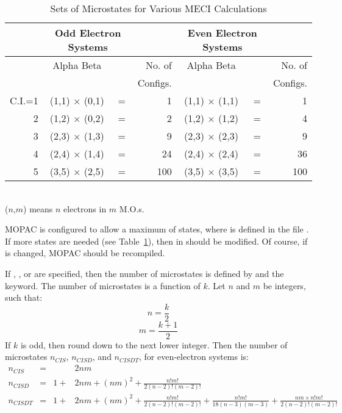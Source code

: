 \label{nmeci}
\begin{table}
\caption{\label{setmic}Sets of Microstates for Various MECI Calculations}
\begin{center}
\begin{tabular}{|rccr|ccr|}
\hline
&\multicolumn{2}{c}{Odd Electron Systems} &  & \multicolumn{2}{c}{Even Electron Systems}&\\ \hline
        &    Alpha   Beta &&No. of   &    Alpha   Beta &&No. of\\
        &                 &&Configs. &                 &&Configs.\\\hline
 C.I.=1&(1,1) $\times$ (0,1) &=&  1    &     (1,1) $\times$ (1,1)&=&   1  \\
      2&(1,2) $\times$ (0,2) &=&  2    &     (1,2) $\times$ (1,2)&=&   4  \\
      3&(2,3) $\times$ (1,3) &=&  9    &     (2,3) $\times$ (2,3)&=&   9  \\
      4&(2,4) $\times$ (1,4) &=& 24    &     (2,4) $\times$ (2,4)&=&  36  \\
      5&(3,5) $\times$ (2,5) &=&100    &     (3,5) $\times$ (3,5)&=& 100  \\\hline
\end{tabular}\\
($n$,$m$) means $n$ electrons in $m$ M.O.s.
\end{center}
\end{table}

 MOPAC is configured to  allow a
maximum of  states, where  is defined in the file
.  If more states are needed (see Table~\ref{setmic}), then
 in   should be modified. Of course, if 
is changed, MOPAC should be recompiled.

If , , or  are specified, then the number of
microstates is defined by  and the keyword.   The number of
microstates is a function of $k$.  Let $n$ and $m$ be integers, such that:
$$
n=\frac{k}{2}
$$
$$
m=\frac{k+1}{2}
$$
If $k$ is odd, then round down to the next lower integer.  Then the number
of microstates $n_{CIS}$, $n_{CISD}$, and $n_{CISDT}$, for even-electron
systems is:
$$
\begin{array}{lcll}
n_{CIS}&=& &2nm \nonumber \\
n_{CISD}&=& 1 + &2nm + (nm)^2 + \frac{n!m!}{2(n-2)!(m-2)!}\nonumber  \\
n_{CISDT} &=& 1 + &2nm + (nm)^2 + \frac{n!m!}{2(n-2)!(m-2)!} +
\frac{n!m!}{18(n-3)(m-3)}+\frac{nm\times n!m!}{2(n-2)!(m-2)!}\nonumber
\end{array}
$$

